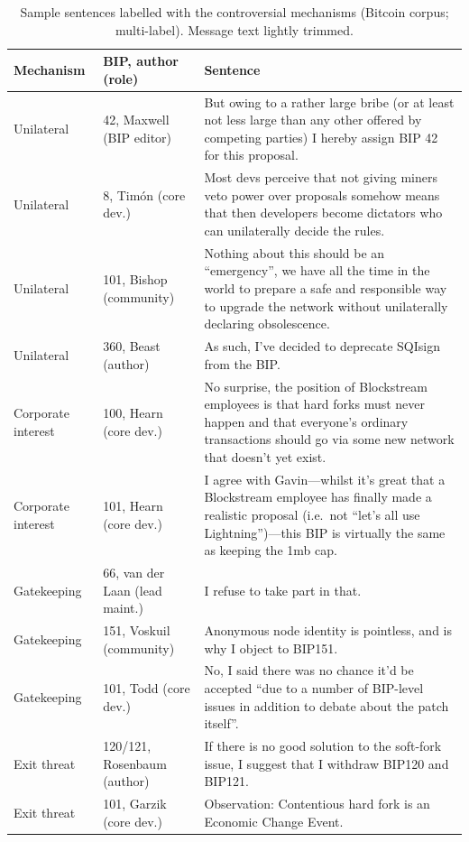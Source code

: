\begin{table}[t]
\caption{Sample sentences labelled with the controversial mechanisms (Bitcoin corpus; multi-label). Message text lightly trimmed.}
\label{tab:rq6examples}
\small
\begin{tabular}{p{}p{}p{}}
\toprule
Mechanism & BIP, author (role) & Sentence \\
\midrule
Unilateral & 42, Maxwell (BIP editor) & But owing to a rather large bribe (or at least not less large than any other offered by competing parties) I hereby assign BIP 42 for this proposal. \\
Unilateral & 8, Tim\'on (core dev.) & Most devs perceive that not giving miners veto power over proposals somehow means that then developers become dictators who can unilaterally decide the rules. \\
Unilateral & 101, Bishop (community) & Nothing about this should be an ``emergency'', we have all the time in the world to prepare a safe and responsible way to upgrade the network without unilaterally declaring obsolescence. \\
Unilateral & 360, Beast (author) & As such, I've decided to deprecate SQIsign from the BIP. \\
Corporate interest & 100, Hearn (core dev.) & No surprise, the position of Blockstream employees is that hard forks must never happen and that everyone's ordinary transactions should go via some new network that doesn't yet exist. \\
Corporate interest & 101, Hearn (core dev.) & I agree with Gavin---whilst it's great that a Blockstream employee has finally made a realistic proposal (i.e.\ not ``let's all use Lightning'')---this BIP is virtually the same as keeping the 1mb cap. \\
Gatekeeping & 66, van der Laan (lead maint.) & I refuse to take part in that. \\
Gatekeeping & 151, Voskuil (community) & Anonymous node identity is pointless, and is why I object to BIP151. \\
Gatekeeping & 101, Todd (core dev.) & No, I said there was no chance it'd be accepted ``due to a number of BIP-level issues in addition to debate about the patch itself''. \\
Exit threat & 120/121, Rosenbaum (author) & If there is no good solution to the soft-fork issue, I suggest that I withdraw BIP120 and BIP121. \\
Exit threat & 101, Garzik (core dev.) & Observation: Contentious hard fork is an Economic Change Event. \\

\end{tabular}
\end{table}
